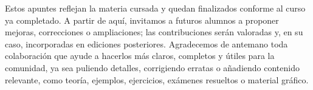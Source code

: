 Estos apuntes reflejan la materia cursada y quedan finalizados conforme al curso ya completado. A partir de aquí, invitamos a futuros alumnos a proponer mejoras, correcciones o ampliaciones; las contribuciones serán valoradas y, en su caso, incorporadas en ediciones posteriores. Agradecemos de antemano toda colaboración que ayude a hacerlos más claros, completos y útiles para la comunidad, ya sea puliendo detalles, corrigiendo erratas o añadiendo contenido relevante, como teoría, ejemplos, ejercicios, exámenes resueltos o material gráfico.